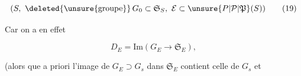 \[
 (S,\ \deleted{\unsure{\text{groupe}}}\,G_0\subset\mathfrak S_S,\ \mathcal E\subset\unsure{P|\mathcal P|\mathfrak P}(S)) \tag*{(19)}
\]

Car on a en effet

\[
 D_E=\mathrm{Im}(G_E\longrightarrow\mathfrak S_E), \tag*{(20)}
\]

(alors que a priori l'image de $G_E\supset G_s$ dans
$\mathfrak S_E$ contient celle de $G_s$ et 

